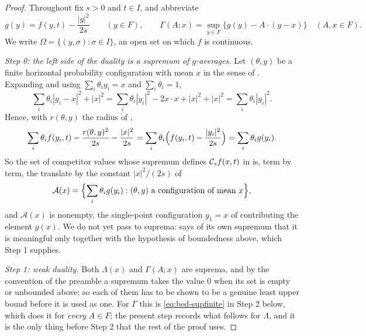 \begin{proof}
Throughout fix $s>0$ and $t\in I$, and abbreviate
\[
  g(y)=f(y,t)-\frac{|y|^2}{2s}\qquad(y\in F),
  \qquad
  \Gamma(A;x)=\sup_{y\in F}\bigl\{g(y)-A\cdot(y-x)\bigr\}\quad(A,x\in F).
\]
We write $\Omega=\{(y,\sigma):\sigma\in I\}$, an open set on which $f$ is
continuous.

\emph{Step 0: the left side of the duality is a supremum of $g$-averages.}
Let $(\theta,y)$ be a finite horizontal probability configuration with mean $x$
in the sense of . Expanding and using
$\sum_i\theta_iy_i=x$ and $\sum_i\theta_i=1$,
\[
  \sum_i\theta_i|y_i-x|^2+|x|^2
   =\sum_i\theta_i|y_i|^2-2x\cdot x+|x|^2+|x|^2
   =\sum_i\theta_i|y_i|^2 .
\]
Hence, with $r(\theta,y)$ the radius of ,
\[
  \sum_i\theta_if(y_i,t)-\frac{r(\theta,y)^2}{2s}-\frac{|x|^2}{2s}
   =\sum_i\theta_i\Bigl(f(y_i,t)-\frac{|y_i|^2}{2s}\Bigr)
   =\sum_i\theta_ig(y_i).
\]
So the set of competitor values whose supremum defines $\mathcal{C}_sf(x,t)$ in
 is, term by term, the translate by the constant $|x|^2/(2s)$
of
\[
  \mathcal A(x)=\Bigl\{\sum_i\theta_ig(y_i):
    (\theta,y)\text{ a configuration of mean }x\Bigr\},
\]
and $\mathcal A(x)$ is nonempty, the single-point configuration $y_1=x$ of
 contributing the element $g(x)$. We do not yet pass to
suprema:  says of its own supremum that it is meaningful only
together with the hypothesis of boundedness above, which Step 1 supplies.

\emph{Step 1: weak duality.}
Both $\Lambda(x)$ and $\Gamma(A;x)$ are suprema, and by the convention of the
preamble a supremum takes the value $0$ when its set is empty or unbounded
above; so each of them has to be shown to be a genuine least upper bound before
it is used as one. For $\Gamma$ this is \eqref{eq:bed-supfinite} in Step 2
below, which does it for \emph{every} $A\in F$; the present step records what
follows for $\Lambda$, and it is the only thing before Step 2 that the rest of
the proof uses.


\end{proof}
